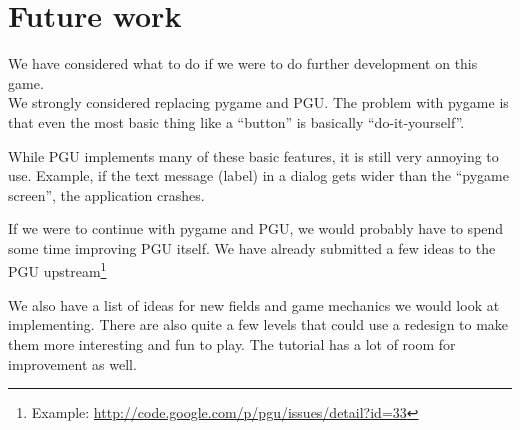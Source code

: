 \section{Future work} 
We have considered what to do if we were to do further development
on this game.\\

We strongly considered replacing pygame and PGU.  The problem with
pygame is that even the most basic thing like a ``button'' is
basically ``do-it-yourself''.

While PGU implements many of these basic features, it is still very
annoying to use.  Example, if the text message (label) in a dialog
gets wider than the ``pygame screen'', the application crashes.

If we were to continue with pygame and PGU, we would probably have to
spend some time improving PGU itself.  We have already submitted a few
ideas to the PGU upstream\footnote{Example:
  \url{http://code.google.com/p/pgu/issues/detail?id=33}}

We also have a list of ideas for new fields and game mechanics we
would look at implementing.  There are also quite a few levels that
could use a redesign to make them more interesting and fun to play.
The tutorial has a lot of room for improvement as well.

